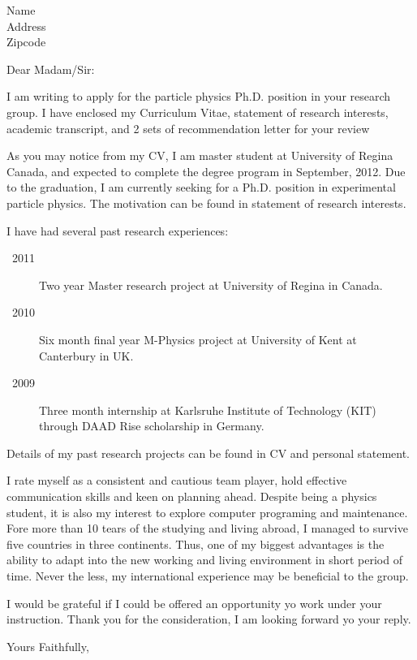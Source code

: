 \documentclass[12pt, letterpaper]{letter}
\begin{document}
 
\begin{letter}{Name \\ Address \\ Zipcode}

\opening{Dear Madam/Sir:}

I am writing to apply for the particle physics Ph.D. position in your research group. I have enclosed my Curriculum Vitae, statement of research interests, academic transcript, and 2 sets of recommendation letter for your review

As you may notice from my CV, I am master student at University of Regina Canada, and expected to complete the degree program in September, 2012. Due to the graduation, I am currently seeking for a Ph.D. position in experimental particle physics. The motivation can be found in statement of research interests.

I have had several past research experiences: 

\begin{description}
	\item[~2011] Two year Master research project at University of Regina in Canada.
	\item[~2010] Six month final year M-Physics project at University of Kent at Canterbury in UK.
	\item[~2009] Three month internship at Karlsruhe Institute of Technology (KIT) through DAAD Rise scholarship in Germany.
\end{description}
\vspace{-2mm}

Details of my past research projects can be found in CV and personal statement.

I rate myself as a consistent and cautious team player, hold effective communication skills and keen on planning ahead. Despite being a physics student, it is also my interest to explore computer programing and maintenance. Fore more than 10 tears of the studying and living abroad, I managed to survive five countries in three continents. Thus, one of my biggest advantages is the ability to adapt into the new working and living environment in short period of time. Never the less, my international experience may be beneficial to the group.

I would be grateful if I could be offered an opportunity yo work under your instruction. Thank you for the consideration, I am looking forward yo your reply.

\closing{Yours Faithfully,}
 



\end{letter}
\end{document}
